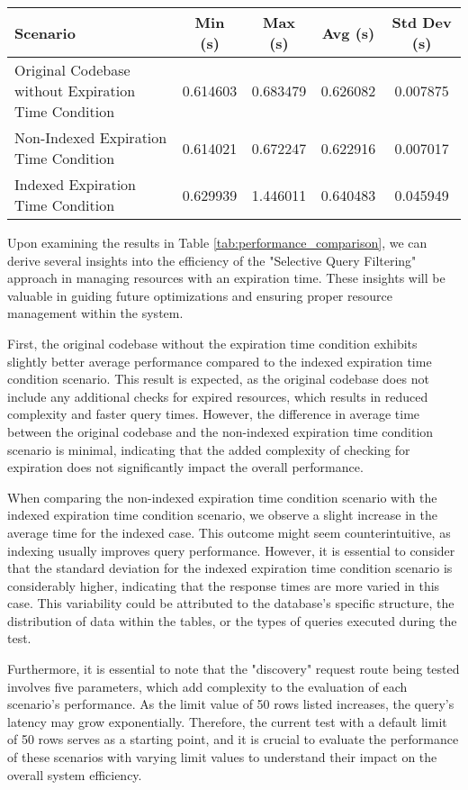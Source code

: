 \documentclass[a4paper,fleqn]{cas-dc}
\begin{document}
\begin{table*}[htbp]
\centering
\caption{Performance comparison of the three scenarios}
\begin{tabular}{lcccc}
\hline
Scenario & Min (s) & Max (s) & Avg (s) & Std Dev (s) \\ \hline
Original Codebase without Expiration Time Condition & 0.614603 & 0.683479 & 0.626082 & 0.007875 \\
Non-Indexed Expiration Time Condition & 0.614021 & 0.672247 & 0.622916 & 0.007017 \\
Indexed Expiration Time Condition & 0.629939 & 1.446011 & 0.640483 & 0.045949 \\ \hline
\end{tabular}
\label{tab:performance_comparison}
\end{table*}

Upon examining the results in Table \ref{tab:performance_comparison}, we can derive several insights into the efficiency of the "Selective Query Filtering" approach in managing resources with an expiration time. These insights will be valuable in guiding future optimizations and ensuring proper resource management within the system.

First, the original codebase without the expiration time condition exhibits slightly better average performance compared to the indexed expiration time condition scenario. This result is expected, as the original codebase does not include any additional checks for expired resources, which results in reduced complexity and faster query times. However, the difference in average time between the original codebase and the non-indexed expiration time condition scenario is minimal, indicating that the added complexity of checking for expiration does not significantly impact the overall performance.

When comparing the non-indexed expiration time condition scenario with the indexed expiration time condition scenario, we observe a slight increase in the average time for the indexed case. This outcome might seem counterintuitive, as indexing usually improves query performance. However, it is essential to consider that the standard deviation for the indexed expiration time condition scenario is considerably higher, indicating that the response times are more varied in this case. This variability could be attributed to the database's specific structure, the distribution of data within the tables, or the types of queries executed during the test.

Furthermore, it is essential to note that the "discovery" request route being tested involves five parameters, which add complexity to the evaluation of each scenario's performance. As the limit value of 50 rows listed increases, the query's latency may grow exponentially. Therefore, the current test with a default limit of 50 rows serves as a starting point, and it is crucial to evaluate the performance of these scenarios with varying limit values to understand their impact on the overall system efficiency.
\end{document}
